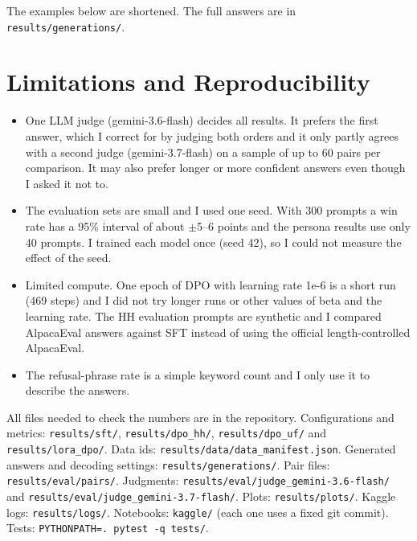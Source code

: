 \documentclass[11pt,a4paper]{article}
\begin{document}
The examples below are shortened. The full answers are in \texttt{results/generations/}.


\section{Limitations and Reproducibility}

\begin{itemize}
\item One LLM judge (gemini-3.6-flash) decides all results. It prefers the first answer, which I correct for by judging both orders and it
only partly agrees with a second judge (gemini-3.7-flash) on a sample of up to 60 pairs per comparison. It may also prefer longer or more confident
answers even though I asked it not to.
\item The evaluation sets are small and I used one seed. With 300 prompts a win rate has a 95\% interval of about $\pm$5--6 points and the
persona results use only 40 prompts. I trained each model once (seed 42), so I could not measure the effect of the seed.
\item Limited compute. One epoch of DPO with learning rate 1e-6 is a short run (469 steps) and I did not try longer runs or other values of
beta and the learning rate. The HH evaluation prompts are synthetic and I compared AlpacaEval answers against SFT instead of using the official
length-controlled AlpacaEval.
\item The refusal-phrase rate is a simple keyword count and I only use it to describe the answers.
\end{itemize}

All files needed to check the numbers are in the repository. Configurations and metrics: \texttt{results/sft/}, \texttt{results/dpo\_hh/},
\texttt{results/dpo\_uf/} and \texttt{results/lora\_dpo/}. Data ids: \texttt{results/data/data\_manifest.json}. Generated answers and decoding
settings: \texttt{results/generations/}. Pair files: \texttt{results/eval/pairs/}. Judgments: \texttt{results/eval/judge\_gemini-3.6-flash/}
and \texttt{results/eval/judge\_gemini-3.7-flash/}. Plots: \texttt{results/plots/}. Kaggle logs: \texttt{results/logs/}. Notebooks:
\texttt{kaggle/} (each one uses a fixed git commit). Tests: \texttt{PYTHONPATH=. pytest -q tests/}.
\end{document}
